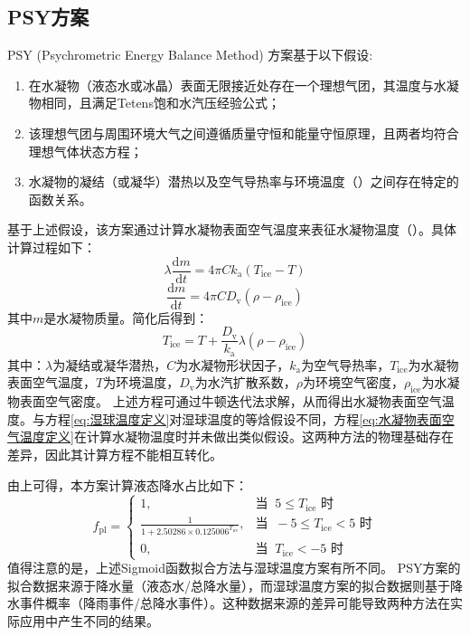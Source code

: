 \subsection{PSY方案}
PSY (Psychrometric Energy Balance Method) 方案基于以下假设:
\begin{enumerate}
\item 在水凝物（液态水或冰晶）表面无限接近处存在一个理想气团，其温度与水凝物相同，且满足Tetens饱和水汽压经验公式；
\item 该理想气团与周围环境大气之间遵循质量守恒和能量守恒原理，且两者均符合理想气体状态方程；
\item 水凝物的凝结（或凝华）潜热以及空气导热率与环境温度（\textcelsius）之间存在特定的函数关系。
\end{enumerate}
基于上述假设，该方案通过计算水凝物表面空气温度来表征水凝物温度（\textcelsius）。具体计算过程如下：
\begin{equation}
\lambda\frac{\mathrm{d}m}{\mathrm{d}t} = 4\pi Ck_{\mathrm{a}}(T_{\mathrm{ice}} - T)
\end{equation}
\begin{equation}
\frac{\mathrm{d}m}{\mathrm{d}t} = 4\pi CD_{\mathrm{v}}(\rho - \rho_{\mathrm{ice}})
\end{equation}
其中$m$是水凝物质量。简化后得到：
\begin{equation}
\label{eq:水凝物表面空气温度定义}
T_{\mathrm{ice}} = T + \frac{D_{\mathrm{v}}}{k_{\mathrm{a}}}\lambda(\rho - \rho_{\mathrm{ice}})
\end{equation}
其中：$\lambda$为凝结或凝华潜热，$C$为水凝物形状因子，$k_{\mathrm{a}}$为空气导热率，$T_{\mathrm{ice}}$为水凝物表面空气温度，$T$为环境温度，$D_{\mathrm{v}}$为水汽扩散系数，$\rho$为环境空气密度，$\rho_{\mathrm{ice}}$为水凝物表面空气密度。
上述方程可通过牛顿迭代法求解，从而得出水凝物表面空气温度。与方程\eqref{eq:湿球温度定义}对湿球温度的等焓假设不同，方程\eqref{eq:水凝物表面空气温度定义}在计算水凝物温度时并未做出类似假设。这两种方法的物理基础存在差异，因此其计算方程不能相互转化。


由上可得，本方案计算液态降水占比如下：
\begin{equation}
  f_{\mathrm{pl}}= \begin{cases}
    1, & \text{当 }\ 5\leqslant T_{\mathrm {ice}} \text{ 时}\\
    \frac{1}{1 + 2.50286\times 0.125006^{T_{\mathrm{ice}}}}, & \text{当 }\ -5\leqslant T_{\mathrm {ice}} < 5 \text{ 时} \\
    0, & \text{当 }\ T_{\mathrm {ice}} < -5 \text{ 时}
  \end{cases}
\end{equation}
值得注意的是，上述Sigmoid函数拟合方法与湿球温度方案有所不同。
PSY方案的拟合数据来源于降水量（液态水/总降水量），而湿球温度方案的拟合数据则基于降水事件概率（降雨事件/总降水事件）。这种数据来源的差异可能导致两种方法在实际应用中产生不同的结果。


